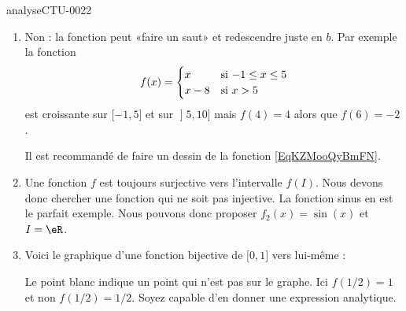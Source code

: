 
\begin{corrige}{analyseCTU-0022}

    \begin{enumerate}
        \item
            Non : la fonction peut «faire un saut» et redescendre juste en \( b\). Par exemple la fonction
            \begin{equation}    \label{EqKZMooQyBmFN}
                f(x)=\begin{cases}
                    x    &   \text{si \( -1\leq x\leq 5\)}\\
                    x-8    &    \text{si \( x>5\)}
                \end{cases}
            \end{equation}
            est croissante sur \( \mathopen[ -1 , 5 \mathclose]\) et sur \( \mathopen] 5 , 10 \mathclose]\) mais \( f(4)=4\) alors que \( f(6)=-2\).

            Il est recommandé de faire un dessin de la fonction \eqref{EqKZMooQyBmFN}.

        \item
            Une fonction \( f\) est toujours surjective vers l'intervalle \( f(I)\). Nous devons donc chercher une fonction qui ne soit pas injective. La fonction sinus en est le parfait exemple. Nous pouvons donc proposer \( f_2(x)=\sin(x)\) et \( I=\eR\).
        \item
            Voici le graphique d'une fonction bijective de \( \mathopen[ 0 , 1 \mathclose]\) vers lui-même :
\begin{center}
   
\end{center}
Le point blanc indique un point qui n'est pas sur le graphe. Ici \( f(1/2)=1\) et non \( f(1/2)=1/2\).
Soyez capable d'en donner une expression analytique.

    \end{enumerate}

\end{corrige}
